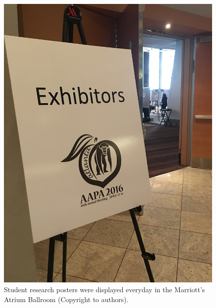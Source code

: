 \documentclass[english]{ijsra}
\begin{document}
	\begin{figure} %
		\includegraphics[width=\linewidth]{figures/Ward-Figure5}
		\caption{Student research posters were displayed everyday in the Marriott's Atrium Ballroom (Copyright to authors).}
		\centering
		\label{fig:Ward-Figure5}
	\end{figure}
	
\end{document}
